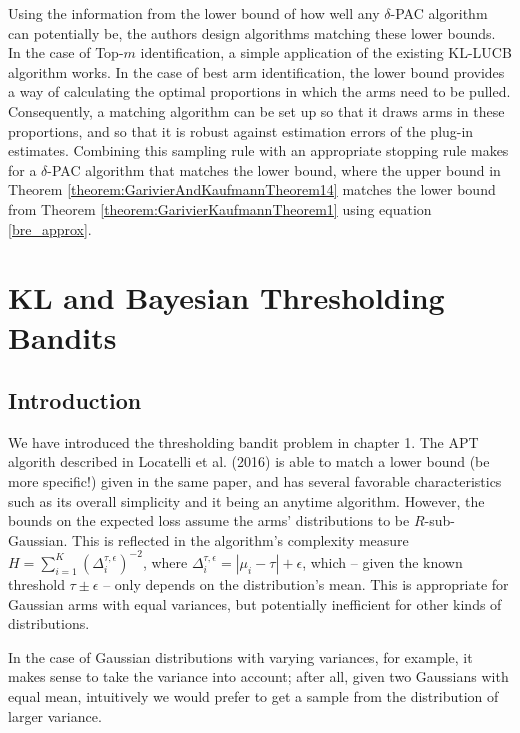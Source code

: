 \documentclass[12pt,]{article}
\begin{document}
Using the information from the lower bound of how well any
\(\delta\)-PAC algorithm can potentially be, the authors design
algorithms matching these lower bounds. In the case of Top-\(m\)
identification, a simple application of the existing KL-LUCB algorithm
works. In the case of best arm identification, the lower bound provides
a way of calculating the optimal proportions in which the arms need to
be pulled. Consequently, a matching algorithm can be set up so that it
draws arms in these proportions, and so that it is robust against
estimation errors of the plug-in estimates. Combining this sampling rule
with an appropriate stopping rule makes for a \(\delta\)-PAC algorithm
that matches the lower bound, where the upper bound in Theorem
\ref{theorem:GarivierAndKaufmannTheorem14} matches the lower bound from
Theorem \ref{theorem:GarivierKaufmannTheorem1} using equation
\eqref{bre_approx}.

\newpage

\section{KL and Bayesian Thresholding
Bandits}\label{kl-and-bayesian-thresholding-bandits}

\subsection{Introduction}\label{introduction}

We have introduced the thresholding bandit problem in chapter 1. The APT
algorith described in Locatelli et al. (2016) is able to match a lower
bound (be more specific!) given in the same paper, and has several
favorable characteristics such as its overall simplicity and it being an
anytime algorithm. However, the bounds on the expected loss assume the
arms' distributions to be \(R\)-sub-Gaussian. This is reflected in the
algorithm's complexity measure
\(H = \sum_{i=1}^K (\Delta_i^{\tau, \epsilon})^{-2}\), where
\(\Delta_i^{\tau,\epsilon} = |\mu_i - \tau| + \epsilon\), which -- given
the known threshold \(\tau \pm \epsilon\) -- only depends on the
distribution's mean. This is appropriate for Gaussian arms with equal
variances, but potentially inefficient for other kinds of distributions.

In the case of Gaussian distributions with varying variances, for
example, it makes sense to take the variance into account; after all,
given two Gaussians with equal mean, intuitively we would prefer to get
a sample from the distribution of larger variance.
\end{document}
